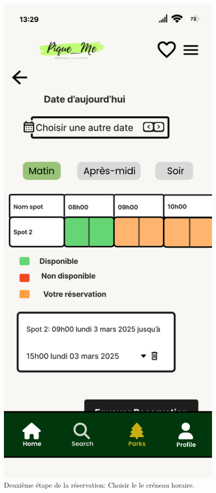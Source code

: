 \documentclass[12pt,a4paper]{article}
\begin{document}
\begin{figure}[h!]
  \centering
  \includegraphics[width=0.9\linewidth]{attachments/reserverSpot2.pdf}
  \caption{Deuxième étape de la réservation: Choisir le le créneau horaire.}
\end{figure}
\end{document}
